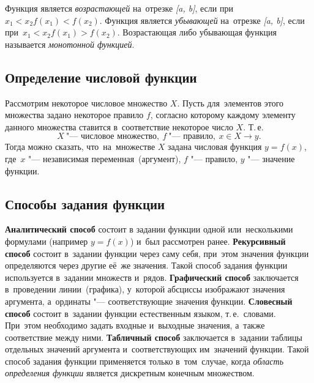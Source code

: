 \documentclass[]{scrartcl}
\begin{document}
Функция является \emph{возрастающей} на~отрезке \textit{[a, b]}, если при~$x_1 < x_2 f(x_1) < f(x_2)$. Функция является \emph{убывающей} на~отрезке \textit{[a, b]}, если при~$x_1 < x_2 f(x_1) > f(x_2)$. Возрастающая либо убывающая функция называется \emph{монотонной функцией}.

\subsection{Определение числовой функции}
Рассмотрим некоторое числовое множество ${\textstyle X}$. Пусть для~элементов этого множества задано некоторое правило ${\textstyle f}$, согласно которому каждому элементу данного множества ставится в~соответствие некоторое число ${\textstyle X}$. Т.\,е.
\begin{equation}\label{eq:function-def-1}
X\ \text{"--- числовое множество},\ f\ \text{"--- правило},\ x \in X \rightarrow y.
\end{equation}
Тогда можно сказать, что~на~множестве ${\textstyle X}$ задана числовая функция ${\textstyle y=f(x)}$, где~${\textstyle x}$ "--- независимая переменная~(аргумент), ${\textstyle f}$ "--- правило, ${\textstyle y}$ "--- значение функции.

\subsection{Способы задания функции}
\textbf{Аналитический способ} состоит в задании функции одной или~несколькими формулами (например ${\textstyle y=f(x)}$) и~был рассмотрен ранее.
\textbf{Рекурсивный способ} состоит в~задании функции через саму себя, при~этом значения функции определяются через другие её~же значения. Такой способ задания функции используется в~задании множеств и~рядов.
\textbf{Графический способ} заключается в~проведении линии~(графика), у~которой абсциссы изображают значения аргумента, а~ординаты "--- соответствующие значения функции.
\textbf{Словесный способ} состоит в~задании функции естественным языком, т.\,е.~словами. При~этом необходимо задать входные и~выходные значения, а~также соответствие между ними.
\textbf{Табличный способ} заключается в~задании таблицы отдельных значений аргумента и~соответствующих им~значений функции. Такой способ задания функции применяется только в~том~случае, когда \emph{область определения функции} является дискретным конечным множеством.
\end{document}
